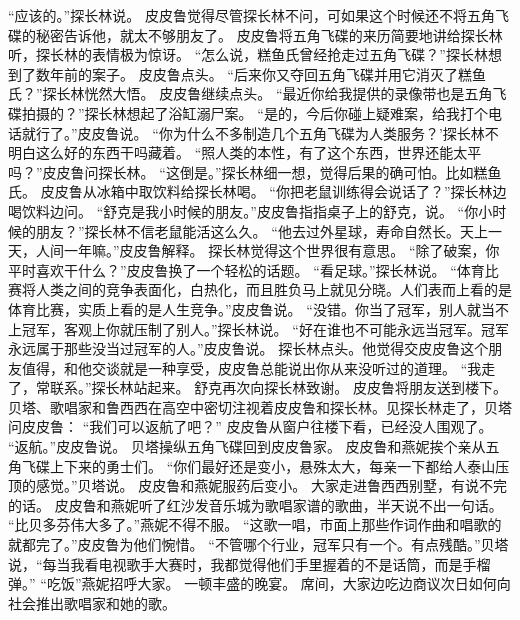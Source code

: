 \documentclass[a4paper,12pt,UTF8,twoside]{ctexbook}
\begin{document}
        “应该的。”探长林说。  
        皮皮鲁觉得尽管探长林不问，可如果这个时候还不将五角飞碟的秘密告诉他，就太不够朋友了。  
        皮皮鲁将五角飞碟的来历简要地讲给探长林听，探长林的表情极为惊讶。  
        “怎么说，糕鱼氏曾经抢走过五角飞碟？”探长林想到了数年前的案子。  
        皮皮鲁点头。  
        “后来你又夺回五角飞碟并用它消灭了糕鱼氏？”探长林恍然大悟。        
        皮皮鲁继续点头。  
        “最近你给我提供的录像带也是五角飞碟拍摄的？”探长林想起了浴缸溺尸案。  
        “是的，今后你碰上疑难案，给我打个电话就行了。”皮皮鲁说。  
        “你为什么不多制造几个五角飞碟为人类服务？’探长林不明白这么好的东西干吗藏着。  
        “照人类的本性，有了这个东西，世界还能太平吗？”皮皮鲁问探长林。  
        “这倒是。”探长林细一想，觉得后果的确可怕。比如糕鱼氏。  
        皮皮鲁从冰箱中取饮料给探长林喝。  
        “你把老鼠训练得会说话了？”探长林边喝饮料边问。  
        “舒克是我小时候的朋友。”皮皮鲁指指桌子上的舒克，说。  
        “你小时候的朋友？”探长林不信老鼠能活这么久。  
        “他去过外星球，寿命自然长。天上一天，人间一年嘛。”皮皮鲁解释。  
        探长林觉得这个世界很有意思。  
        “除了破案，你平时喜欢干什么？”皮皮鲁换了一个轻松的话题。  
        “看足球。”探长林说。        
        “体育比赛将人类之间的竞争表面化，白热化，而且胜负马上就见分晓。人们表而上看的是体育比赛，实质上看的是人生竞争。”皮皮鲁说。  
        “没错。你当了冠军，别人就当不上冠军，客观上你就压制了别人。”探长林说。  
        “好在谁也不可能永远当冠军。冠军永远属于那些没当过冠军的人。”皮皮鲁说。  
        探长林点头。他觉得交皮皮鲁这个朋友值得，和他交谈就是一种享受，皮皮鲁总能说出你从来没听过的道理。  
        “我走了，常联系。”探长林站起来。  
        舒克再次向探长林致谢。  
        皮皮鲁将朋友送到楼下。  
        贝塔、歌唱家和鲁西西在高空中密切注视着皮皮鲁和探长林。见探长林走了，贝塔问皮皮鲁：  
        “我们可以返航了吧？”  
        皮皮鲁从窗户往楼下看，已经没人围观了。  
        “返航。”皮皮鲁说。  
        贝塔操纵五角飞碟回到皮皮鲁家。  
        皮皮鲁和燕妮挨个亲从五角飞碟上下来的勇士们。  
        “你们最好还是变小，悬殊太大，每亲一下都给人泰山压顶的感觉。”贝塔说。  
        皮皮鲁和燕妮服药后变小。        
        大家走进鲁西西别墅，有说不完的话。  
        皮皮鲁和燕妮听了红沙发音乐城为歌唱家谱的歌曲，半天说不出一句话。  
        “比贝多芬伟大多了。”燕妮不得不服。  
        “这歌一唱，市面上那些作词作曲和唱歌的就都完了。”皮皮鲁为他们惋惜。  
        “不管哪个行业，冠军只有一个。有点残酷。”贝塔说，“每当我看电视歌手大赛时，我都觉得他们手里握着的不是话筒，而是手榴弹。”  
        “吃饭”燕妮招呼大家。  
        一顿丰盛的晚宴。  
        席间，大家边吃边商议次日如何向社会推出歌唱家和她的歌。  
\end{document}
